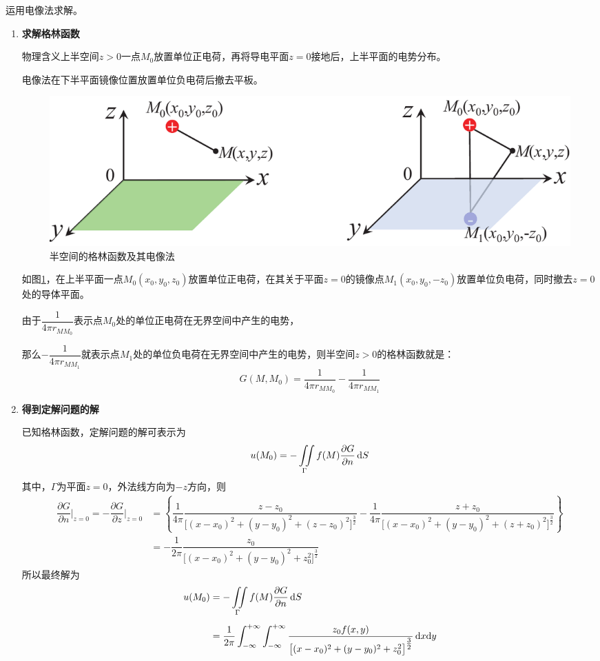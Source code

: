 \solve 运用电像法求解。
\begin{enumerate}[\textbf{步骤} 1 ]
	\item \textbf{求解格林函数}
	
	物理含义\quad 上半空间$z>0$一点$M_0$放置单位正电荷，再将导电平面$z=0$接地后，上半平面的电势分布。
	
	电像法\quad 在下半平面镜像位置放置单位负电荷后撤去平板。
	\vspace*{0.5em}
	\begin{figure}[!htb]
		\centering
		\includegraphics[width=0.8\linewidth]{pic/格林半平面.pdf}
		\caption{半空间的格林函数及其电像法}
		\label{格林半平面}
	\end{figure}
	\vspace*{-0.5em}
	
	如图\ref{格林半平面}，在上半平面一点$M_0(x_0,y_0,z_0)$放置单位正电荷，在其关于平面$z=0$的镜像点$M_1(x_0,y_0,-z_0)$放置单位负电荷，同时撤去$z = 0$处的导体平面。
	
	由于$\dfrac{1}{4\pi r_{MM_0}}$表示点$M_0$处的单位正电荷在无界空间中产生的电势，
	
	那么$-\dfrac{1}{4\pi r_{MM_1}}$就表示点$M_1$处的单位负电荷在无界空间中产生的电势，则半空间$z>0$的格林函数就是：
	\begin{equation}
		G(M,M_0) = \dfrac{1}{4\pi r_{MM_0}} - \dfrac{1}{4\pi r_{MM_1}}
	\end{equation}

	\item \textbf{得到定解问题的解}
	
	已知格林函数，定解问题的解可表示为
	\begin{equation}
		u(M_0) = - \iint \limits_{\Gamma} f(M)\dfrac{\partial G}{\partial n}\, {\rm{d}} S
	\end{equation}
	其中，$\Gamma$为平面$z = 0$，外法线方向为$-z$方向，则
	\begin{align*}
		\dfrac{\partial G}{\partial n}\Bigg|_{z = 0} = - \dfrac{\partial G}{\partial z}\Bigg|_{z = 0} &=
		\left \lbrace\dfrac{1}{4\pi}\dfrac{z-z_0}{\big[(x-x_0)^2 + (y-y_0)^2 + (z-z_0)^2\big]^{\textstyle \frac{3}{2}}} -\dfrac{1}{4\pi}\dfrac{z+z_0}{\big[(x-x_0)^2 + (y-y_0)^2 + (z+z_0)^2\big]^{\textstyle \frac{3}{2}}} \right \rbrace\\[0.5em]
		& = -\dfrac{1}{2\pi} \dfrac{z_0}{\big[(x-x_0)^2 + (y-y_0)^2 + z_0^2\big]^{\textstyle \frac{3}{2}}}
	\end{align*}
	所以最终解为
	\begin{align}
		u(M_0) & = - \iint\limits_{\Gamma}f(M) \dfrac{\partial G}{\partial n}\, {\rm{d}} S \notag \\[0.5em]
		& = \dfrac{1}{2\pi} \int_{-\infty}^{+\infty}\int_{-\infty}^{+\infty} \dfrac{z_0f(x,y)}{\big[(x-x_0)^2 + (y-y_0)^2 + z_0^2\big]^{\textstyle \frac{3}{2}}}\, {\rm{d}} x {\rm{d}} y
	\end{align}
\end{enumerate}

